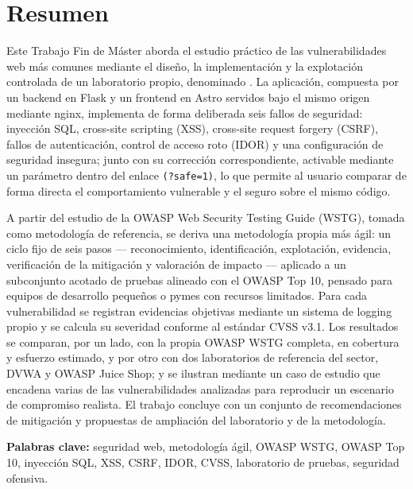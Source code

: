 \chapter*{Resumen}

Este Trabajo Fin de Máster aborda el estudio práctico de las vulnerabilidades
web más comunes mediante el diseño, la implementación y la explotación
controlada de un laboratorio propio, denominado \breachlab. La aplicación,
compuesta por un backend en Flask y un frontend en Astro servidos bajo el
mismo origen mediante nginx, implementa de forma deliberada seis fallos de
seguridad: inyección SQL, cross-site scripting (XSS), cross-site request
forgery (CSRF), fallos de autenticación, control de acceso roto (IDOR) y una
configuración de seguridad insegura; junto con su corrección correspondiente,
activable mediante un parámetro dentro del enlace \texttt{(?safe=1)}, lo que permite al 
usuario comparar de forma directa el comportamiento vulnerable y el seguro sobre el mismo código.

A partir del estudio de la OWASP Web Security Testing Guide (WSTG), tomada
como metodología de referencia, se deriva una metodología propia más ágil:
un ciclo fijo de seis pasos --- reconocimiento, identificación, explotación,
evidencia, verificación de la mitigación y valoración de impacto ---
aplicado a un subconjunto acotado de pruebas alineado con el OWASP Top 10,
pensado para equipos de desarrollo pequeños o pymes con recursos limitados.
Para cada vulnerabilidad se registran evidencias objetivas mediante un
sistema de logging propio y se calcula su severidad conforme al estándar
CVSS v3.1. Los resultados se comparan, por un lado, con la propia OWASP
WSTG completa, en cobertura y esfuerzo estimado, y por otro con dos
laboratorios de referencia del sector, DVWA y OWASP Juice Shop; y se
ilustran mediante un caso de estudio que encadena varias de las
vulnerabilidades analizadas para reproducir un escenario de compromiso
realista. El trabajo concluye con un conjunto de recomendaciones de
mitigación y propuestas de ampliación del laboratorio y de la metodología.

\bigskip
\noindent\textbf{Palabras clave:} seguridad web, metodología ágil,
OWASP WSTG, OWASP Top 10, inyección SQL, XSS, CSRF, IDOR, CVSS, laboratorio
de pruebas, seguridad ofensiva.
